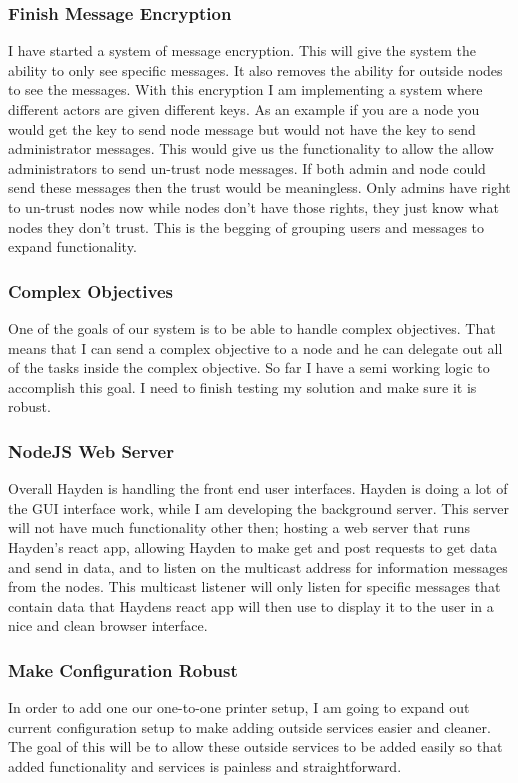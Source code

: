 \documentclass[draftclsnofoot, onecolumn, compsoc, 10pt]{IEEEtran}
\begin{document}
\subsubsection{Finish Message Encryption}
I have started a system of message encryption. This will give the system the ability to only see specific messages. It also removes the ability for outside nodes to see the messages. With this encryption I am implementing a system where different actors are given different keys. As an example if you are a node you would get the key to send node message but would not have the key to send administrator messages. This would give us the functionality to allow the allow administrators to send un-trust node messages. If both admin and node could send these messages then the trust would be meaningless. Only admins have right to un-trust nodes now while nodes don't have those rights, they just know what nodes they don't trust. This is the begging of grouping users and messages to expand functionality. 

\subsubsection{Complex Objectives}
One of the goals of our system is to be able to handle complex objectives. That means that I can send a complex objective to a node and he can delegate out all of the tasks inside the complex objective. So far I have a semi working logic to accomplish this goal. I need to finish testing my solution and make sure it is robust.

\subsubsection{NodeJS Web Server}
Overall Hayden is handling the front end user interfaces. Hayden is doing a lot of the GUI interface work, while I am developing the background server. This server will not have much functionality other then; hosting a web server that runs Hayden's react app, allowing Hayden to make get and post requests to get data and send in data, and to listen on the multicast address for information messages from the nodes. This multicast listener will only listen for specific messages that contain data that Haydens react app will then use to display it to the user in a nice and clean browser interface.

\subsubsection{Make Configuration Robust}
In order to add one our one-to-one printer setup, I am going to expand out current configuration setup to make adding outside services easier and cleaner. The goal of this will be to allow these outside services to be added easily so that added functionality and services is painless and straightforward.
\end{document}

